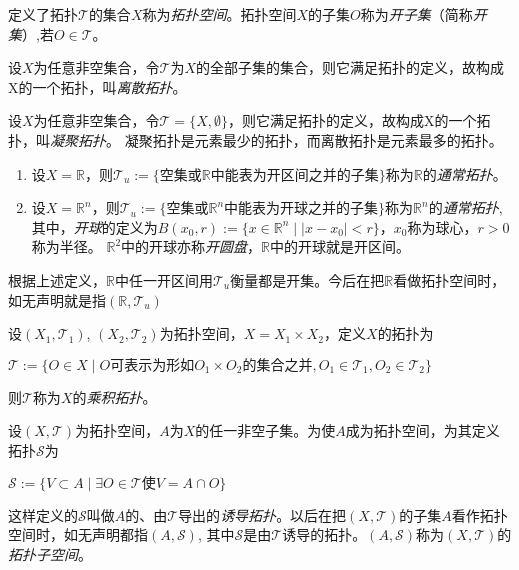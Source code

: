 \begin{definition}
定义了拓扑$\mathscr{T}$的集合$X$称为\emph{拓扑空间}。拓扑空间$X$的子集$O$称为\emph{开子集}（简称\emph{开集}）,若$O \in \mathscr{T}$。
\end{definition}

\begin{example}
设$X$为任意非空集合，令$\mathscr{T}$为$X$的全部子集的集合，则它满足拓扑的定义，故构成X的一个拓扑，叫\emph{离散拓扑}。
\end{example}

\begin{example}
设$X$为任意非空集合，令$\mathscr{T} = \{X, \emptyset\}$，则它满足拓扑的定义，故构成X的一个拓扑，叫\emph{凝聚拓扑}。
凝聚拓扑是元素最少的拓扑，而离散拓扑是元素最多的拓扑。
\end{example}

\begin{example}
\begin{enumerate}[（1）]
\item 设$X = \mathbb{R}$，则$\mathscr{T}_u := \{\text{空集或}\mathbb{R}\text{中能表为开区间之并的子集}\}$称为$\mathbb{R}$的\emph{通常拓扑}。
\item 设$X = \mathbb{R}^n$，则$\mathscr{T}_u := \{\text{空集或}\mathbb{R}^n\text{中能表为开球之并的子集}\}$称为$\mathbb{R}^n$的\emph{通常拓扑},
其中，\emph{开球}的定义为$B(x_0, r) := \{x \in \mathbb{R}^n \mid |x - x_0| < r\}$，$x_0$称为球心，$r > 0$称为半径。
$\mathbb{R}^2$中的开球亦称\emph{开圆盘}，$\mathbb{R}$中的开球就是开区间。
\end{enumerate}
根据上述定义，$\mathbb{R}$中任一开区间用$\mathscr{T}_u$衡量都是开集。今后在把$\mathbb{R}$看做拓扑空间时，如无声明就是指$(\mathbb{R}, \mathscr{T}_u)$
\end{example}

\begin{example}
设$(X_1, \mathscr{T}_1)$, $(X_2, \mathscr{T}_2)$为拓扑空间，$X = X_1 \times X_2$，定义$X$的拓扑为

$\mathscr{T} := \{O \in X \mid O\text{可表示为形如}O_1 \times O_2\text{的集合之并}, O_1 \in \mathscr{T}_1, O_2 \in \mathscr{T}_2\}$

则$\mathscr{T}$称为$X$的\emph{乘积拓扑}。
\end{example}

\begin{example}
设$(X, \mathscr{T})$为拓扑空间，$A$为$X$的任一非空子集。为使$A$成为拓扑空间，为其定义拓扑$\mathscr{S}$为

$\mathscr{S} := \{V \subset A \mid \exists O \in \mathscr{T} \text{使} V = A \cap O\}$

这样定义的$\mathscr{S}$叫做$A$的、由$\mathscr{T}$导出的\emph{诱导拓扑}。以后在把$(X, \mathscr{T})$的子集$A$看作拓扑空间时，如无声明都指$(A, \mathscr{S})$,
其中$\mathscr{S}$是由$\mathscr{T}$诱导的拓扑。$(A, \mathscr{S})$称为$(X, \mathscr{T})$的\emph{拓扑子空间}。
\end{example}

